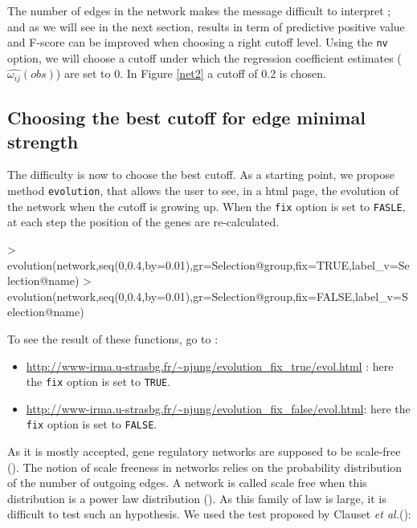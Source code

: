\documentclass[a4paper]{article}
\begin{document}
The number of edges in the network makes the message difficult to interpret ; and as we will see in the next section, results in term of predictive positive value and F-score can be improved when choosing a right cutoff level. Using the \texttt{nv} option, we will choose a cutoff under which the regression coefficient estimates ($\hat{\omega_{ij}}(obs)$) are set to $0$. In Figure \ref{net2} a cutoff of 0.2 is chosen. 

\subsection{Choosing the best cutoff for edge minimal strength}

The difficulty is now to choose the best cutoff. As a starting point, we propose method \texttt{evolution}, that allows the user to see, in a html page, the evolution of the network when the cutoff is growing up. When the \texttt{fix} option is set to \texttt{FASLE}, at each step the position of the genes are re-calculated. 

\begin{Schunk}
\begin{Sinput}
> evolution(network,seq(0,0.4,by=0.01),gr=Selection@group,fix=TRUE,label_v=Selection@name)
> evolution(network,seq(0,0.4,by=0.01),gr=Selection@group,fix=FALSE,label_v=Selection@name)
\end{Sinput}
\end{Schunk}

To see the result of these functions, go to :

\begin{itemize}
\item \url{http://www-irma.u-strasbg.fr/~njung/evolution_fix_true/evol.html} : here the \texttt{fix} option is set to \texttt{TRUE}.
\item \url{http://www-irma.u-strasbg.fr/~njung/evolution_fix_false/evol.html}: here the \texttt{fix} option is set to \texttt{FALSE}.
\end{itemize}

As it is mostly accepted, gene regulatory networks are supposed to be scale-free (\cite{jeong2000large}). 
The notion of scale freeness in networks relies on the probability distribution of the number of outgoing edges. 
A network is called scale free when this distribution is a power law distribution (\cite{clauset2009power}). 
As this family of law is large, it is difficult to test such an hypothesis. 
We used the test proposed by Clauset \textit{et al.}(\cite{clauset2009power}):
\end{document}
